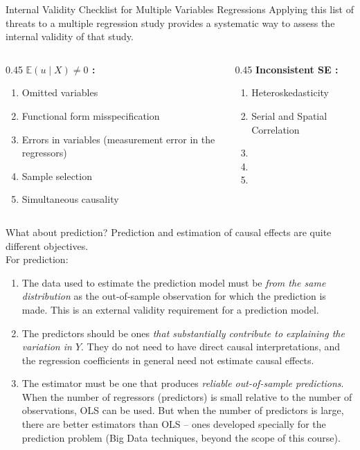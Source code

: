 \documentclass[notes,10pt, aspectratio=169]{beamer}
\begin{document}
\begin{frame}{Internal Validity Checklist for Multiple Variables Regressions}
Applying this list of threats to a multiple regression study provides a systematic way to assess the internal validity of that study.\\[1em]
\begin{columns}
\begin{column}{0.45\textwidth}
\textbf{$\mathbb{E}(u\mid X)\neq 0$ :}
\begin{enumerate}
    \item Omitted variables
    \item Functional form misspecification
    \item Errors in variables (measurement error in the regressors)
    \item Sample selection
    \item Simultaneous causality
\end{enumerate}
\end{column}
\begin{column}{0.45\textwidth}
\textbf{Inconsistent SE :}
\begin{enumerate}
    \item Heteroskedasticity
    \item Serial and Spatial Correlation
    \item[]
    \item[]
    \item[]
\end{enumerate}
\end{column}
\end{columns}
\end{frame}

\begin{frame}{What about prediction?}
Prediction and estimation of causal effects are quite different objectives.\\[1em]
For prediction:
\begin{enumerate}
    \item The data used to estimate the prediction model must be \textit{from the same distribution} as the out-of-sample observation for which the prediction is made. This is an external validity requirement for a prediction model.
    \item The predictors should be ones \textit{that substantially contribute to explaining the variation in $Y$}. They do not need to have direct causal interpretations, and the regression coefficients in general need not estimate causal effects.
    \item The estimator must be one that produces \textit{reliable out-of-sample predictions}. When the number of regressors (predictors) is small relative to the number of observations, OLS can be used. But when the number of predictors is large, there are better estimators than OLS -- ones developed specially for the prediction problem (Big Data techniques, beyond the scope of this course).
\end{enumerate}
\end{frame}
\end{document}
